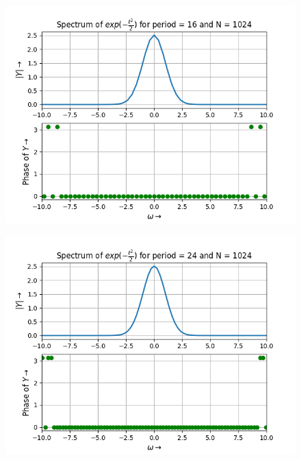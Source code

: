 \documentclass[12pt, a4paper]{article}
\begin{document}
\begin{figure}[H]
    \centering
    \includegraphics[scale = 0.8]{Figure_12.png}
    \label{fig:sample}
\end{figure}

\begin{figure}[H]
    \centering
    \includegraphics[scale = 0.8]{Figure_13.png}
    \label{fig:sample}
\end{figure}
\end{document}
